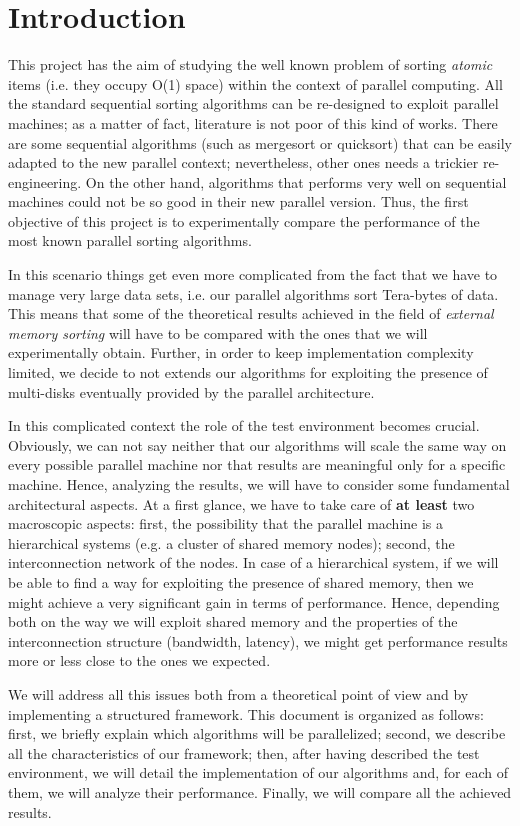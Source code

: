 \section{Introduction}
This project has the aim of studying the well known problem of sorting \textit{atomic} items (i.e. they occupy O(1) space) within the context of parallel computing. All the standard sequential sorting algorithms can be re-designed to exploit parallel machines; as a matter of fact, literature is not poor of this kind of works. There are some sequential algorithms (such as mergesort or quicksort) that can be easily adapted to the new parallel context; nevertheless, other ones needs a trickier re-engineering. On the other hand, algorithms that performs very well on sequential machines could not be so good in their new parallel version. Thus, the first objective of this project is to experimentally compare the performance of the most known parallel sorting algorithms. 

In this scenario things get even more complicated from the fact that we have to manage very large data sets, i.e. our parallel algorithms sort Tera-bytes of data. This means that some of the theoretical results achieved in the field of \textit{external memory sorting} will have to be compared with the ones that we will experimentally obtain. Further, in order to keep implementation complexity limited, we decide to not extends our algorithms for exploiting the presence of multi-disks eventually provided by the parallel architecture. 

In this complicated context the role of the test environment becomes crucial. Obviously, we can not say neither that our algorithms will scale the same way on every possible parallel machine nor that results are meaningful only for a specific machine. Hence, analyzing the results, we will have to consider some fundamental architectural aspects. At a first glance, we have to take care of \textbf{at least} two macroscopic aspects: first, the possibility that the parallel machine is a hierarchical systems (e.g. a cluster of shared memory nodes); second, the interconnection network of the nodes. In case of a hierarchical system, if we will be able to find a way for exploiting the presence of shared memory, then we might achieve a very significant gain in terms of performance. Hence, depending both on the way we will exploit shared memory and the properties of the interconnection structure (bandwidth, latency), we might get performance results more or less close to the ones we expected.

We will address all this issues both from a theoretical point of view and by implementing a structured framework. This document is organized as follows: first, we briefly explain which algorithms will be parallelized; second, we describe all the characteristics of our framework; then, after having described the test environment, we will detail the implementation of our algorithms and, for each of them, we will analyze their performance. Finally, we will compare all the achieved results.